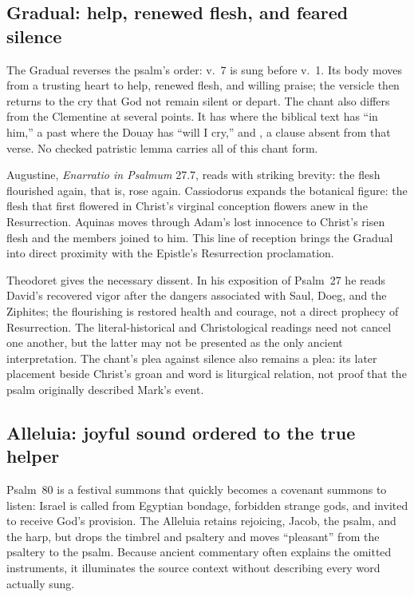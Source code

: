 \subsection*{Gradual: help, renewed flesh, and feared silence\enspace{}}

The Gradual reverses the psalm's order: v.~7 is sung before v.~1. Its body
moves from a trusting heart to help, renewed flesh, and willing praise; the
versicle then returns to the cry that God not remain silent or depart. The
chant also differs from the Clementine at several points. It has
 where the biblical text has ``in him,'' a past
 where the Douay has ``will I cry,'' and
, a clause absent from that verse. No checked
patristic lemma carries all of this chant form.

Augustine, \emph{Enarratio in Psalmum} 27.7, reads
 with striking brevity: the flesh flourished again,
that is, rose again. Cassiodorus expands the botanical figure: the flesh that
first flowered in Christ's virginal conception flowers anew in the
Resurrection. Aquinas moves through Adam's lost innocence to Christ's risen
flesh and the members joined to him. This line of reception brings the
Gradual into direct proximity with the Epistle's Resurrection proclamation.

Theodoret gives the necessary dissent. In his exposition of Psalm~27 he reads
David's recovered vigor after the dangers associated with Saul, Doeg, and the
Ziphites; the flourishing is restored health and courage, not a direct
prophecy of Resurrection. The literal-historical and Christological readings
need not cancel one another, but the latter may not be presented as the only
ancient interpretation. The chant's plea against silence also remains a plea:
its later placement beside Christ's groan and word is liturgical relation, not
proof that the psalm originally described Mark's event.

\subsection*{Alleluia: joyful sound ordered to the true helper\enspace{}}

Psalm~80 is a festival summons that quickly becomes a covenant summons to
listen: Israel is called from Egyptian bondage, forbidden strange gods, and
invited to receive God's provision. The Alleluia retains rejoicing, Jacob,
the psalm, and the harp, but drops the timbrel and psaltery and moves
``pleasant'' from the psaltery to the psalm. Because ancient commentary often
explains the omitted instruments, it illuminates the source context without
describing every word actually sung.

